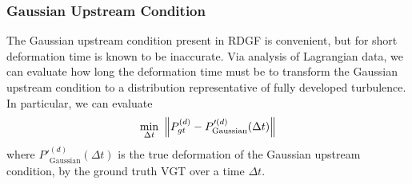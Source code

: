 \subsubsection{Gaussian Upstream Condition}
The Gaussian upstream condition present in RDGF is convenient, but for short deformation time is known to be inaccurate. Via analysis of Lagrangian data, we can evaluate how long the deformation time must be to transform the Gaussian upstream condition to a distribution representative of fully developed turbulence. In particular, we can evaluate
\begin{equation}
    \min_{\Delta t} \ \norm{P^{(d)}_{gt} - P'^{(d)}_{\text{Gaussian}}(\Delta t)}
\end{equation}
where $P'^{(d)}_{\text{Gaussian}}(\Delta t)$ is the true deformation of the Gaussian upstream condition, by the ground truth VGT over a time $\Delta t$.